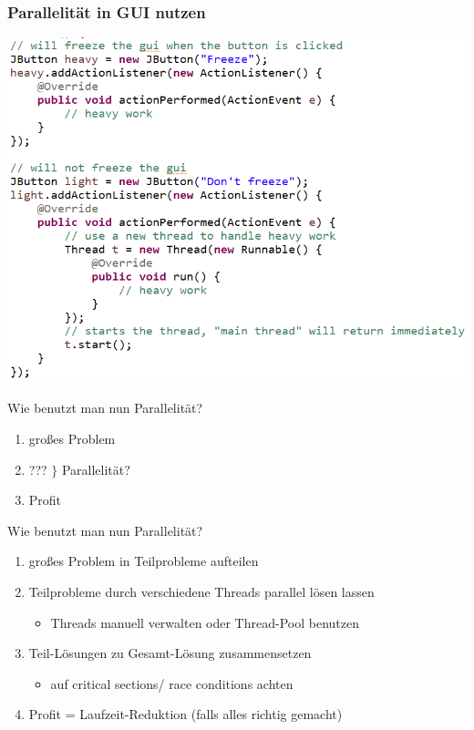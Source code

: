 \documentclass[18pt]{beamer}
\begin{document}
	\begin{frame}
		\frametitle{Parallelität in GUI nutzen}
		\centering
		\includegraphics[scale=0.4]{./pics/tut5/extra-thread.png}
	\end{frame}

	\begin{frame}{Wie benutzt man nun Parallelität?}
		\begin{enumerate}
			\item großes Problem
			\item ??? $\rbrace$ Parallelität?
			\item Profit
		\end{enumerate}
	\end{frame}

	\begin{frame}{Wie benutzt man nun Parallelität?}
		\begin{enumerate}
			\item großes Problem in Teilprobleme aufteilen
			\item Teilprobleme durch verschiedene Threads parallel lösen lassen
			\begin{itemize}
				\item Threads manuell verwalten oder Thread-Pool benutzen
			\end{itemize}
			\item Teil-Lösungen zu Gesamt-Lösung zusammensetzen
			\begin{itemize}
				\item auf critical sections/ race conditions achten
			\end{itemize}
			\item Profit = Laufzeit-Reduktion (falls alles richtig gemacht)
		\end{enumerate}
	\end{frame}
\end{document}
